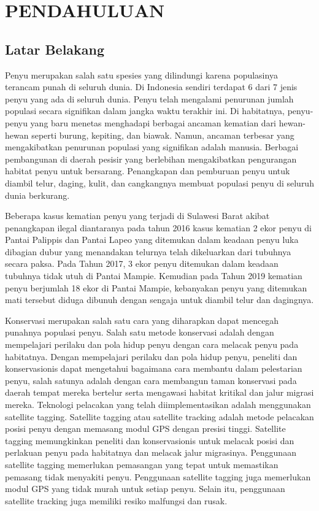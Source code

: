\chapter{PENDAHULUAN}

\section{Latar Belakang}

Penyu merupakan salah satu spesies yang dilindungi karena populasinya terancam punah di seluruh dunia. 
Di Indonesia sendiri terdapat 6 dari 7 jenis penyu yang ada di seluruh dunia. 
Penyu telah mengalami penurunan jumlah populasi secara signifikan dalam jangka waktu terakhir ini. 
Di habitatnya, penyu-penyu yang baru menetas menghadapi berbagai ancaman kematian dari hewan-hewan seperti burung, kepiting, dan biawak. 
Namun, ancaman terbesar yang mengakibatkan penurunan populasi yang signifikan adalah manusia. 
Berbagai pembangunan di daerah pesisir yang berlebihan mengakibatkan pengurangan habitat penyu untuk bersarang. 
Penangkapan dan pemburuan penyu untuk diambil telur, daging, kulit, dan cangkangnya membuat populasi penyu di seluruh dunia berkurang. 
\parencite{JKT602}

Beberapa kasus kematian penyu yang terjadi di Sulawesi Barat akibat penangkapan ilegal diantaranya pada tahun 2016 kasus kematian 2 ekor penyu di Pantai Palippis dan Pantai Lapeo yang ditemukan dalam keadaan penyu luka dibagian dubur yang menandakan telurnya telah dikeluarkan dari tubuhnya secara paksa. 
Pada Tahun 2017, 3 ekor penyu ditemukan dalam keadaan tubuhnya tidak utuh di Pantai Mampie.  
Kemudian pada Tahun 2019 kematian penyu berjumlah 18 ekor di Pantai Mampie, kebanyakan penyu yang ditemukan mati tersebut diduga dibunuh dengan sengaja untuk diambil telur dan dagingnya. 
\parencite{nur2022pelatihan}

Konservasi merupakan salah satu cara yang diharapkan dapat mencegah punahnya populasi penyu.
Salah satu metode konservasi adalah dengan mempelajari perilaku dan pola hidup penyu dengan cara melacak penyu pada habitatnya.
Dengan mempelajari perilaku dan pola hidup penyu, peneliti dan konservasionis dapat mengetahui bagaimana cara membantu dalam pelestarian penyu, 
salah satunya adalah dengan cara membangun taman konservasi pada daerah tempat mereka bertelur serta mengawasi habitat kritikal dan jalur migrasi mereka. 
Teknologi pelacakan yang telah diimplementasikan adalah menggunakan satellite tagging.
Satellite tagging atau satellite tracking adalah metode pelacakan posisi penyu dengan memasang modul GPS dengan presisi tinggi.
Satellite tagging memungkinkan peneliti dan konservasionis untuk melacak posisi dan perlakuan penyu pada habitatnya dan melacak jalur migrasinya.
Penggunaan satellite tagging memerlukan pemasangan yang tepat untuk memastikan pemasang tidak menyakiti penyu.
Penggunaan satellite tagging juga memerlukan modul GPS yang tidak murah untuk setiap penyu.
Selain itu, penggunaan satellite tracking juga memiliki resiko malfungsi dan rusak.
\parencite{10.3389/fmars.2018.00432}

